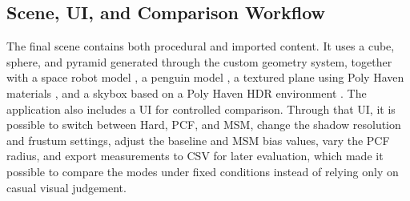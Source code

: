 \subsection{Scene, UI, and Comparison Workflow}

The final scene contains both procedural and imported content. It uses a cube, sphere, and pyramid generated through the custom geometry system, together with a space robot model \cite{sketchfab_space_robot}, a penguin model \cite{sketchfab_penguin}, a textured plane using Poly Haven materials \cite{polyhaven_beach,polyhaven_brick,polyhaven_rock,polyhaven_wood}, and a skybox based on a Poly Haven HDR environment \cite{polyhaven_skybox}. The application also includes a UI for controlled comparison. Through that UI, it is possible to switch between Hard, PCF, and MSM, change the shadow resolution and frustum settings, adjust the baseline and MSM bias values, vary the PCF radius, and export measurements to CSV for later evaluation, which made it possible to compare the modes under fixed conditions instead of relying only on casual visual judgement.
